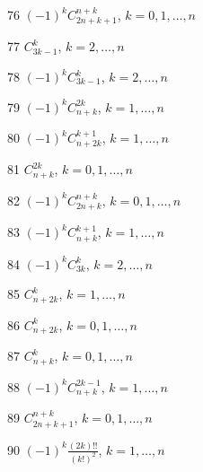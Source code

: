 \documentclass[11pt, russian]{article}
\begin{document}
76 
$(-1)^{k}C_{2n+k+1}^{n+k}$, $k=0,1,\ldots,n$\par\vspace{5mm}

77 
$C_{3k-1}^{k}$, $k=2,\ldots,n$\par\vspace{5mm}

78 
$(-1)^{k}C_{3k-1}^{k}$, $k=2,\ldots,n$\par\vspace{5mm}

79 
$(-1)^{k}C_{n+k}^{2k}$, $k=1,\ldots,n$\par\vspace{5mm}

80 
$(-1)^{k}C_{n+2k}^{k+1}$, $k=1,\ldots,n$\par\vspace{5mm}

81 
$C_{n+k}^{2k}$, $k=0,1,\ldots,n$\par\vspace{5mm}

82 
$(-1)^{k}C_{2n+k}^{n+k}$, $k=0,1,\ldots,n$\par\vspace{5mm}

83 
$(-1)^{k}C_{n+k}^{k+1}$, $k=1,\ldots,n$\par\vspace{5mm}

84 
$(-1)^{k}C_{3k}^{k}$, $k=2,\ldots,n$\par\vspace{5mm}

85 
$C_{n+2k}^{k}$, $k=1,\ldots,n$\par\vspace{5mm}

86 
$C_{n+2k}^{k}$, $k=0,1,\ldots,n$\par\vspace{5mm}

87 
$C_{n+k}^{k}$, $k=0,1,\ldots,n$\par\vspace{5mm}

88 
$(-1)^{k}C_{n+k}^{2k-1}$, $k=1,\ldots,n$\par\vspace{5mm}

89 
$C_{2n+k+1}^{n+k}$, $k=0,1,\ldots,n$\par\vspace{5mm}

90 
$(-1)^{k}\frac{(2k)!!}{(k!)^2}$, $k=1,\ldots,n$\par\vspace{5mm}
\end{document}
